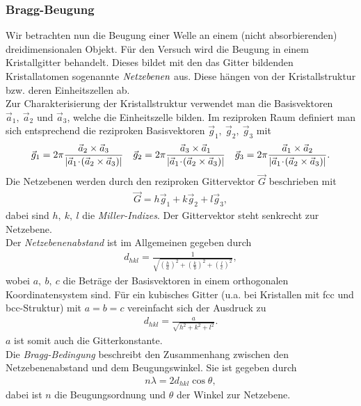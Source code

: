\subsubsection{Bragg-Beugung}
Wir betrachten nun die Beugung einer Welle an einem (nicht absorbierenden) dreidimensionalen Objekt. Für den Versuch wird die Beugung in einem Kristallgitter behandelt. Dieses bildet mit den das Gitter bildenden Kristallatomen sogenannte $\emph{Netzebenen}$ aus. Diese hängen von der Kristallstruktur bzw. deren Einheitszellen ab.\\
Zur Charakterisierung der Kristallstruktur verwendet man die Basisvektoren $\vec{a}_1,~\vec{a}_2$ und $\vec{a}_3$, welche die Einheitszelle bilden. Im reziproken Raum definiert man sich entsprechend die reziproken Basisvektoren $\vec{g}_1,~\vec{g}_2,~\vec{g}_3$ mit
\begin{align}
\vec{g}_1=2\pi\frac{\vec{a}_2\times\vec{a}_3}{\left|\vec{a}_1\!\cdot\! (\vec{a}_2\times\vec{a}_3)\right|}\quad
\vec{g}_2=2\pi\frac{\vec{a}_3\times\vec{a}_1}{\left|\vec{a}_1\!\cdot\! (\vec{a}_2\times\vec{a}_3)\right|}\quad
\vec{g}_3=2\pi\frac{\vec{a}_1\times\vec{a}_2}{\left|\vec{a}_1\!\cdot\! (\vec{a}_2\times\vec{a}_3)\right|}.
\end{align}
Die Netzebenen werden durch den reziproken Gittervektor $\vec{G}$ beschrieben mit
\begin{align}
\vec{G}=h\vec{g}_1+k\vec{g}_2+l\vec{g}_3,
\end{align}
dabei sind $h,~k,~l$ die \emph{Miller-Indizes}. Der Gittervektor steht senkrecht zur Netzebene.\\
Der \emph{Netzebenenabstand} ist im Allgemeinen gegeben durch
\begin{align}
d_{hkl}=\frac{1}{\sqrt{\left(\frac{h}{a}\right)^2+\left(\frac{k}{b}\right)^2+\left(\frac{l}{c}\right)^2}},
\end{align}
wobei $a,~b,~c$ die Beträge der Basisvektoren in einem orthogonalen Koordinatensystem sind. Für ein kubisches Gitter (u.a. bei Kristallen mit fcc und bcc-Struktur) mit $a=b=c$ vereinfacht sich der Ausdruck zu
\begin{align}
d_{hkl}=\frac{a}{\sqrt{h^2+k^2+l^2}}.
\end{align}
$a$ ist somit auch die Gitterkonstante.\\
Die \emph{Bragg-Bedingung} beschreibt den Zusammenhang zwischen den Netzebenenabstand und dem Beugungswinkel. Sie ist gegeben durch
\begin{align}
n\lambda=2d_{hkl}\cos\theta,
\end{align}
dabei ist $n$ die Beugungsordnung und $\theta$ der Winkel zur Netzebene.
